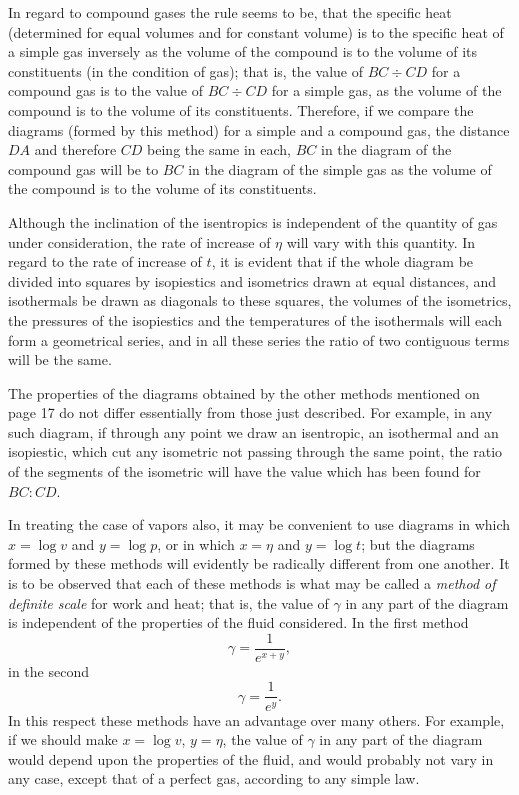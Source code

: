 \documentclass[11pt]{article}
\begin{document}
In regard to compound gases the rule seems to be, that the specific heat (determined for equal volumes and for constant volume) is to the specific heat of a simple gas inversely as the volume of the compound is to the volume of its constituents (in the condition of gas); that is, the value of $BC\div CD$ for a compound gas is to the value of $BC\div CD$ for a simple gas, as the volume of the compound is to the volume of its constituents. Therefore, if we compare the diagrams (formed by this method) for a simple and a compound gas, the distance $DA$ and therefore $CD$ being the same in each, $BC$ in the diagram of the compound gas will be to $BC$ in the diagram of the simple gas as the volume of the compound is to the volume of its constituents.

Although the inclination of the isentropics is independent of the quantity of gas under consideration, the rate of increase of $\eta$ will vary with this quantity. In regard to the rate of increase of $t$, it is evident that if the whole diagram be divided into squares by isopiestics and isometrics drawn at equal distances, and isothermals be drawn as diagonals to these squares, the volumes of the isometrics, the pressures of the isopiestics and the temperatures of the isothermals will each form a geometrical series, and in all these series the ratio of two contiguous terms will be the same.

The properties of the diagrams obtained by the other methods mentioned on page 17 do not differ essentially from those just described. For example, in any such diagram, if through any point we draw an isentropic, an isothermal and an isopiestic, which cut any isometric not passing through the same point, the ratio of the segments of the isometric will have the value which has been found for $BC:CD$.

In treating the case of vapors also, it may be convenient to use diagrams in which $x=\log v$ and $y=\log p$, or in which $x=\eta$ and $y=\log t$; but the diagrams formed by these methods will evidently be radically different from one another. It is to be observed that each of these methods is what may be called a \emph{method of definite scale} for work and heat; that is, the value of $\gamma$ in any part of the diagram is independent of the properties of the fluid considered. In the first method
\[
\gamma=\frac{1}{e^{x+y}},
\]
in the second
\[
\gamma=\frac{1}{e^y}.
\]
In this respect these methods have an advantage over many others. For example, if we should make $x=\log v$, $y=\eta$, the value of $\gamma$ in any part of the diagram would depend upon the properties of the fluid, and would probably not vary in any case, except that of a perfect gas, according to any simple law.
\end{document}
